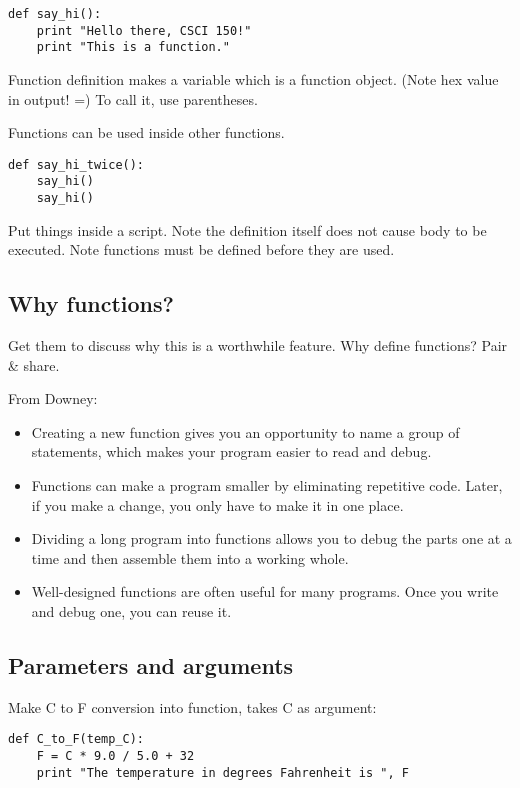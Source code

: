 \documentclass{article}
\begin{document}
\begin{verbatim}
def say_hi():
    print "Hello there, CSCI 150!"
    print "This is a function."
\end{verbatim}

Function definition makes a variable which is a function object. (Note
hex value in output! =) To call it, use parentheses.

Functions can be used inside other functions.

\begin{verbatim}
def say_hi_twice():
    say_hi()
    say_hi()
\end{verbatim}

Put things inside a script.  Note the definition itself does not cause
body to be executed.  Note functions must be defined before they are
used.

\subsection*{Why functions?}

Get them to discuss why this is a worthwhile feature.  Why define
functions?  Pair \& share.

From Downey:

\begin{itemize}
\item Creating a new function gives you an opportunity to name a group
  of statements, which makes your program easier to read and debug.
\item  Functions can make a program smaller by eliminating repetitive code.
  Later, if you make a change, you only have to make it in one place.
\item Dividing a long program into
  functions allows you to debug the parts one at a time and then
  assemble them into a working whole.
\item Well-designed functions are often useful for many programs.
  Once you write and debug one, you can reuse it.
\end{itemize}

\subsection*{Parameters and arguments}

Make C to F conversion into function, takes C as argument:
\begin{verbatim}
def C_to_F(temp_C):
    F = C * 9.0 / 5.0 + 32
    print "The temperature in degrees Fahrenheit is ", F
\end{verbatim}
\end{document}
